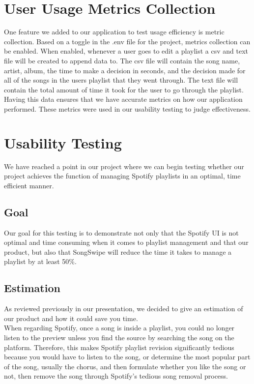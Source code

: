 \documentclass{article}
\begin{document}
\section{User Usage Metrics Collection}
\quad One feature we added to our application to test usage efficiency is metric collection. Based on a toggle in the .env file for the project, metrics collection can be enabled. When enabled, whenever a user goes to edit a playlist a csv and text file will be created to append data to. The csv file will contain the song name, artist, album, the time to make a decision in seconds, and the decision made for all of the songs in the users playlist that they went through. The text file will contain the total amount of time it took for the user to go through the playlist. Having this data ensures that we have accurate metrics on how our application performed. These metrics were used in our usability testing to judge effectiveness.

\section{Usability Testing}
\quad We have reached a point in our project where we can begin testing whether our project achieves the function of managing Spotify playlists in an optimal, time efficient manner.

\subsection{Goal}
\quad Our goal for this testing is to demonstrate not only that the Spotify UI is not optimal and time consuming when it comes to playlist management and that our product, but also that SongSwipe will reduce the time it takes to manage a playlist by at least 50\%.

\subsection{Estimation}
\quad As reviewed previously in our presentation, we decided to give an estimation of our product and how it could save you time. \\

When regarding Spotify, once a song is inside a playlist, you could no longer listen to the preview unless you find the source by searching the song on the platform. Therefore, this makes Spotify playlist revision significantly tedious because you would have to listen to the song, or determine the most popular part of the song, usually the chorus, and then formulate whether you like the song or not, then remove the song through Spotify’s tedious song removal process. \\
\end{document}
